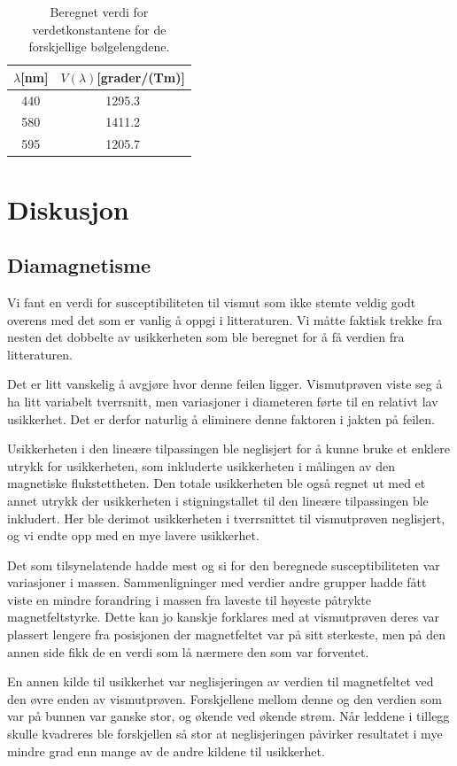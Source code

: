 \documentclass[a4paper,11pt, twocolumn]{article}
\begin{document}
\begin{table}
	\centering
	\caption{Beregnet verdi for verdetkonstantene for de forskjellige bølgelengdene.}
	\begin{tabular}{cc}
		\toprule
		\toprule
		$\lambda$[nm] & $V(\lambda)$[grader/(Tm)]\\
		\toprule
		440 & 1295.3\\
		580 & 1411.2\\
		595 & 1205.7\\
		\toprule
	\end{tabular}
	\label{tab:verdetkonstanten}
\end{table}
\section{Diskusjon}
\subsection{Diamagnetisme}
Vi fant en verdi for susceptibiliteten til vismut som ikke stemte veldig godt overens med det som er vanlig å oppgi i litteraturen. Vi måtte faktisk trekke fra nesten det dobbelte av usikkerheten som ble beregnet for å få verdien fra litteraturen. 

Det er litt vanskelig å avgjøre hvor denne feilen ligger. Vismutprøven viste seg å ha litt variabelt tverrsnitt, men variasjoner i diameteren førte til en relativt lav usikkerhet. Det er derfor naturlig å eliminere denne faktoren i jakten på feilen.

Usikkerheten i den lineære tilpassingen ble neglisjert for å kunne bruke et enklere utrykk for usikkerheten, som inkluderte usikkerheten i målingen av den magnetiske flukstettheten. Den totale usikkerheten ble også regnet ut med et annet utrykk der usikkerheten i stigningstallet til den lineære tilpassingen ble inkludert. Her ble derimot usikkerheten i tverrsnittet til vismutprøven neglisjert, og vi endte opp med en mye lavere usikkerhet.

Det som tilsynelatende hadde mest og si for den beregnede susceptibiliteten var variasjoner i massen. Sammenligninger med verdier andre grupper hadde fått viste en mindre forandring i massen fra laveste til høyeste påtrykte magnetfeltstyrke. Dette kan jo kanskje forklares med at vismutprøven deres var plassert lengere fra posisjonen der magnetfeltet var på sitt sterkeste, men på den annen side fikk de en verdi som lå nærmere den som var forventet.

En annen kilde til usikkerhet var neglisjeringen av verdien til magnetfeltet ved den øvre enden av vismutprøven. Forskjellene mellom denne og den verdien som var på bunnen var ganske stor, og økende ved økende strøm. Når leddene i tillegg skulle kvadreres ble forskjellen så stor at neglisjeringen påvirker resultatet i mye mindre grad enn mange av de andre kildene til usikkerhet.
\end{document}
